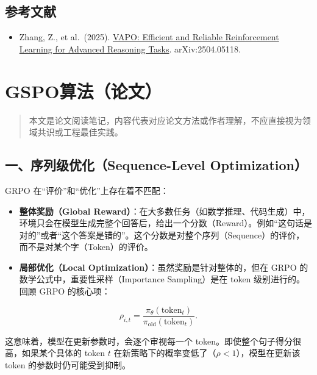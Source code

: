 \hypertarget{ux53c2ux8003ux6587ux732e-108}{%
\subsection{参考文献}\label{ux53c2ux8003ux6587ux732e-108}}

\begin{itemize}
\tightlist
\item
  Zhang, Z., et al.~(2025). \href{https://arxiv.org/abs/2504.05118}{VAPO: Efficient and Reliable Reinforcement Learning for Advanced Reasoning Tasks}. arXiv:2504.05118.
\end{itemize}

\clearpage

\hypertarget{gspoux7b97ux6cd5ux8bbaux6587}{%
\section{GSPO算法（论文）}\label{gspoux7b97ux6cd5ux8bbaux6587}}

\begin{quote}
本文是论文阅读笔记，内容代表对应论文方法或作者理解，不应直接视为领域共识或工程最佳实践。
\end{quote}

\hypertarget{ux4e00ux5e8fux5217ux7ea7ux4f18ux5316sequence-level-optimization}{%
\subsection{一、序列级优化（Sequence-Level Optimization）}\label{ux4e00ux5e8fux5217ux7ea7ux4f18ux5316sequence-level-optimization}}

GRPO 在``评价''和``优化''上存在着不匹配：

\begin{itemize}
\tightlist
\item
  \textbf{整体奖励（Global Reward）}：在大多数任务（如数学推理、代码生成）中，环境只会在模型生成完整个回答后，给出一个分数（Reward）。例如``这句话是对的''或者``这个答案是错的''。这个分数是对整个序列（Sequence）的评价，而不是对某个字（Token）的评价。
\item
  \textbf{局部优化（Local Optimization）}：虽然奖励是针对整体的，但在 GRPO 的数学公式中，重要性采样（Importance Sampling）是在 token 级别进行的。回顾 GRPO 的核心项：
\end{itemize}

\[
\rho_{i,t}
=
\frac{\pi_\theta(\mathrm{token}_t)}
{\pi_{\mathrm{old}}(\mathrm{token}_t)}.
\]

这意味着，模型在更新参数时，会逐个审视每一个 token。即使整个句子得分很高，如果某个具体的 token \(t\) 在新策略下的概率变低了（\(\rho<1\)），模型在更新该 token 的参数时仍可能受到抑制。

